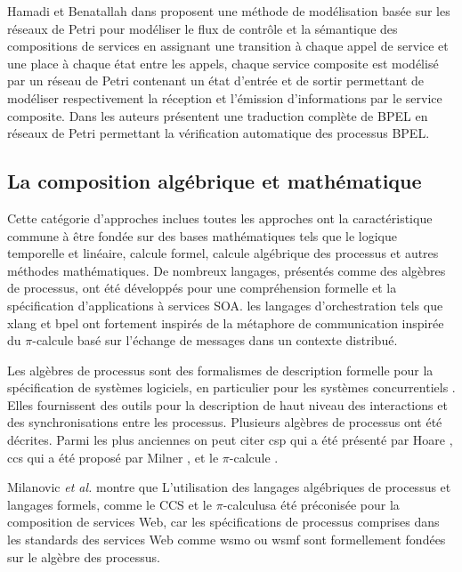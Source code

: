     Hamadi et Benatallah dans \cite{hamadi2003petri} proposent une
    méthode de modélisation basée sur les réseaux de Petri pour
    modéliser le flux de contrôle et la sémantique des compositions de
    services en assignant une transition à chaque appel de service et
    une place à chaque état entre les appels, chaque service composite
    est modélisé par un réseau de Petri contenant un état d'entrée et
    de sortir permettant de modéliser respectivement la réception et
    l'émission d'informations par le service composite. Dans
    \cite{ouyang2007formal} les auteurs présentent une traduction
    complète de \textsc{BPEL} en réseaux de Petri permettant la
    vérification automatique des processus \textsc{BPEL}.

    \subsection{La composition algébrique et mathématique}
    \label{sec:les-apprc-math}
    Cette catégorie d'approches inclues toutes les approches ont la
    caractéristique commune à être fondée sur des bases mathématiques
    tels que le logique temporelle et linéaire, calcule formel,
    calcule algébrique des processus et autres méthodes
    mathématiques. De nombreux langages, présentés comme des algèbres
    de processus, ont été développés pour une compréhension formelle
    et la spécification d'applications à services \textsc{SOA}. les
    langages d'orchestration tels que \acrshort{xlang} et
    \acrshort{bpel} ont fortement inspirés de la métaphore de
    communication inspirée du $\pi$-calcule basé sur l'échange de
    messages dans un contexte distribué.

    Les algèbres de processus sont des formalismes de description
    formelle pour la spécification de systèmes logiciels, en
    particulier pour les systèmes concurrentiels
    \cite{dumez2010approche}. Elles fournissent des outils pour la
    description de haut niveau des interactions et des
    synchronisations entre les processus. Plusieurs algèbres de
    processus ont été décrites. Parmi les plus anciennes on peut citer
    \acrshort{csp} qui a été présenté par Hoare
    \cite{hoare1978communicating}, \acrshort{ccs} qui a été proposé
    par Milner \cite{milner1982finite}, \cite{milner1989communication}
    et le $\pi$-calcule \cite{milner1992calculus}.

    Milanovic \textit{et al.} \cite{milanovic2004current} montre que
    L'utilisation des langages algébriques de processus et langages
    formels, comme le \textsc{CCS} et le $\pi$-calculusa été
    préconisée pour la composition de services Web, car les
    spécifications de processus comprises dans les standards des
    services Web comme \acrshort{wsmo} ou \acrshort{wsmf} sont
    formellement fondées sur le algèbre des processus.

